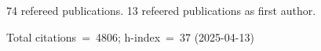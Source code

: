 74 refereed publications. 13 refeered publications as first author.

Total citations~=~4806; h-index~=~37 (2025-04-13)